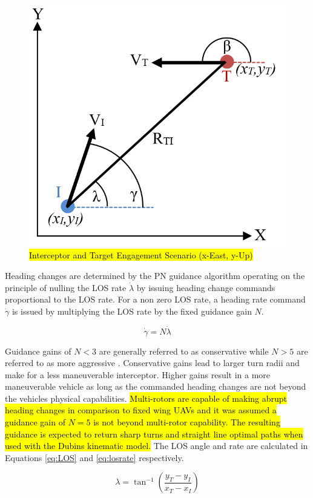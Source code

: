 \documentclass[conference]{IEEEtran}
\begin{document}
\begin{figure}[H]
	\centering
	\includegraphics[width=6 cm]{Engagement_Model.PNG}
	\caption{\hl{Interceptor and Target Engagement Scenario (x-East, y-Up)}}
	\label{fig:Egagement}
\end{figure}

 Heading changes are determined by the PN guidance algorithm operating on the principle of nulling the LOS rate $\dot{\lambda}$ by issuing heading change commands proportional to the LOS rate. For a non zero LOS rate, a heading rate command $\dot{\gamma}$ is issued by multiplying the LOS rate by the fixed guidance gain $N$.

\begin{equation} \label{eq:PNlaw}
\dot{\gamma} = N\dot{\lambda}
\end{equation}

Guidance gains of $N < 3$ are generally referred to as conservative while $N > 5$ are referred to as more aggressive \cite{zarchan}. Conservative gains lead to larger turn radii and make for a less maneuverable interceptor. Higher gains result in a more maneuverable vehicle as long as the commanded heading changes are not beyond the vehicles physical capabilities. \hl{Multi-rotors are capable of making abrupt heading changes in comparison to fixed wing UAVs and it was assumed a guidance gain of $N = 5$ is not beyond multi-rotor capability. The resulting guidance is expected to return sharp turns and straight line optimal paths when used with the Dubins kinematic model.} The LOS angle and rate are calculated in Equations \ref{eq:LOS} and \ref{eq:losrate} respectively. 





\begin{equation} \label{eq:LOS}
\lambda = \tan^{-1} \left(\frac{y_T - y_I}{x_T - x_I}\right)
\end{equation} 
\end{document}
